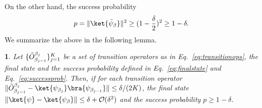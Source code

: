 \documentclass{article}
\theoremstyle{plain}
\newtheorem{lem}{\protect\lemmaname}
\theoremstyle{plain}
\theoremstyle{plain}
\theoremstyle{plain}
\theoremstyle{plain}
\theoremstyle{plain}
\theoremstyle{plain}
\providecommand{\lemmaname}{Lemma}
\newcommand{\calO}{\ensuremath{\mathcal{O}}}
\begin{document}
On the other hand, the success probability
\begin{equation}
    p = \| \ket{\Tilde{\psi}_\beta} \|^2  \ge (1-\frac{\delta}{2})^2 \ge 1 - \delta.
\end{equation}
We summarize the above in the following lemma.
\begin{lem}
    \label{lem:finalerror}
    Let $\{ \Tilde{O}_{\beta_{j-1}}^{\beta_{j}} \}_{j=1}^K$ be a set of transition operators as in Eq.~\eqref{eq:transitionops}, the final state and the success probability defined in Eq.~\eqref{eq:finalstate} and Eq.~\eqref{eq:successprob}. Then, if for each transition operator $\|\Tilde{O}_{\beta_{j-1}}^{\beta_{j}} - \ket{\psi_{\beta_{j}}} \bra{\psi_{\beta_{j-1}}}\| \le \delta/(2K)$, the final state $\|\ket{\psi} - \ket{\psi_\beta}\| \le \delta + \calO(\delta^2)$ and the success probability $p \ge 1 - \delta$.
\end{lem}
\end{document}
